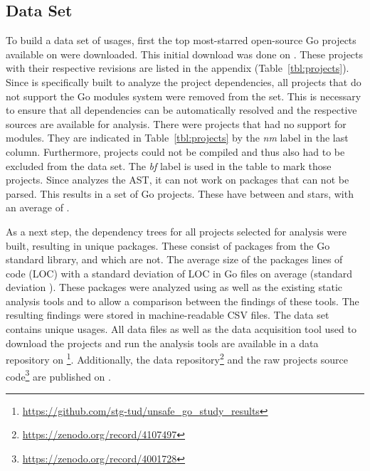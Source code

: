 
\subsection{Data Set}\label{subsec:go-geiger:evaluation:data-set}

To build a data set of \unsafe{} usages, first the top \projsTotal{} most-starred open-source Go projects available on
\github{} were downloaded.
This initial download was done on .
These \projsTotal{} projects with their respective revisions are listed in the appendix (Table~\ref{tbl:projects}).
Since \toolGeiger{} is specifically built to analyze the project dependencies, all projects that do not support the Go
modules system were removed from the set.
This is necessary to ensure that all dependencies can be automatically resolved and the respective sources are available
for analysis.
There were \projsWithoutModules{} projects that had no support for modules.
They are indicated in Table~\ref{tbl:projects} by the \textit{nm} label in the last column.
Furthermore, \projsNotCompiled{} projects could not be compiled and thus also had to be excluded from the data set.
The \textit{bf} label is used in the table to mark those projects.
Since \toolGeiger{} analyzes the \acrshort{AST}, it can not work on packages that can not be parsed.
This results in a set of \projsAnalyzed{} Go projects.
These have between  and  stars, with an average of .

As a next step, the dependency trees for all projects selected for analysis were built, resulting in \packagesAnalyzed{}
unique packages.
These consist of  packages from the Go standard library, and  which are not.
The average size of the packages  lines of code (\acrshort{LOC}) with a standard deviation of
 \acrshort{LOC} in  Go files on average (standard deviation ).
These packages were analyzed using \toolGeiger{} as well as the existing static analysis tools \toolVet{} and
\toolGosec{} to allow a comparison between the findings of these tools.
The resulting findings were stored in machine-readable \acrshort{CSV} files.
The data set contains \uniqueUnsafeFindings{} unique \unsafe{} usages.
All data files as well as the data acquisition tool used to download the projects and run the analysis tools are
available in a data repository on \github{}\footnote{\url{https://github.com/stg-tud/unsafe_go_study_results}}.
Additionally, the data repository\footnote{\url{https://zenodo.org/record/4107497}} and the raw projects source
code\footnote{\url{https://zenodo.org/record/4001728}} are published on \zenodo{}.


